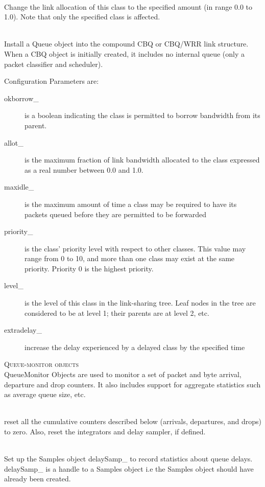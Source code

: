 \\
Change the link allocation of this class to the specified amount (in range
0.0 to 1.0). Note that only the specified class is affected. 

\\
Install a Queue object into the compound CBQ or CBQ/WRR link structure.
When a CBQ object is initially created, it includes no internal queue
(only a packet classifier and scheduler).

Configuration Parameters are:
\begin{description}
\item[okborrow\_] is a boolean indicating the class is permitted to borrow
bandwidth from its parent. 

\item[allot\_] is the maximum fraction of link bandwidth allocated to the
class expressed as a real number between 0.0 and 1.0. 

\item[maxidle\_] is the maximum amount of time a class may be required to
have its packets queued before they are permitted to be forwarded 

\item[priority\_]
is the class' priority level with respect to other classes. This value may
range from 0 to 10, and more than one class may exist at the same
priority. Priority 0 is the highest priority. 

\item[level\_]
is the level of this class in the link-sharing tree. Leaf nodes in the
tree are considered to be at level 1; their parents are at level 2, etc. 

\item[extradelay\_]
increase the delay experienced by a delayed class by the specified time 
\end{description}


\textsc{Queue-monitor objects}\\
QueueMonitor Objects are used to monitor a set of packet and byte arrival,
departure and drop counters. It also includes support for aggregate
statistics such as average queue size, etc.

\\
reset all the cumulative counters described below (arrivals, departures,
and drops) to zero. Also, reset the integrators and delay sampler, if
defined. 

\\
Set up the Samples object delaySamp\_ to record statistics about queue
delays. delaySamp\_ is a handle to a Samples object i.e the Samples object
should have already been created. 


